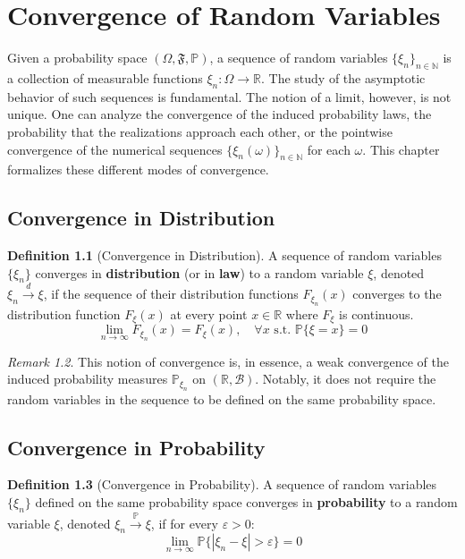 \documentclass[12pt, openany]{book}
\theoremstyle{definition}
\newtheorem{definition}{Definition}[section]
\theoremstyle{plain}
\theoremstyle{remark}
\newtheorem{remark}[definition]{Remark}
\newcommand{\R}{\mathbb{R}}
\newcommand{\N}{\mathbb{N}}
\newcommand{\B}{\mathcal{B}}
\newcommand{\probP}{\mathbb{P}}
\newcommand{\germF}{\mathfrak{F}} %
\begin{document}
\chapter{Convergence of Random Variables}

Given a probability space $(\Omega, \germF, \probP)$, a sequence of random variables $\{\xi_n\}_{n \in \N}$ is a collection of measurable functions $\xi_n: \Omega \to \R$. The study of the asymptotic behavior of such sequences is fundamental. The notion of a limit, however, is not unique. One can analyze the convergence of the induced probability laws, the probability that the realizations approach each other, or the pointwise convergence of the numerical sequences $\{\xi_n(\omega)\}_{n \in \N}$ for each $\omega$. This chapter formalizes these different modes of convergence.

\section{Convergence in Distribution}

\begin{definition}[Convergence in Distribution]
A sequence of random variables $\{\xi_n\}$ converges in \textbf{distribution} (or in \textbf{law}) to a random variable $\xi$, denoted $\xi_n \xrightarrow{d} \xi$, if the sequence of their distribution functions $F_{\xi_n}(x)$ converges to the distribution function $F_\xi(x)$ at every point $x \in \R$ where $F_\xi$ is continuous.
$$ \lim_{n \to \infty} F_{\xi_n}(x) = F_\xi(x), \quad \forall x \text{ s.t. } \probP\{\xi = x\} = 0 $$
\end{definition}

\begin{remark}
This notion of convergence is, in essence, a weak convergence of the induced probability measures $\probP_{\xi_n}$ on $(\R, \B)$. Notably, it does not require the random variables in the sequence to be defined on the same probability space.
\end{remark}

\section{Convergence in Probability}

\begin{definition}[Convergence in Probability]
A sequence of random variables $\{\xi_n\}$ defined on the same probability space converges in \textbf{probability} to a random variable $\xi$, denoted $\xi_n \xrightarrow{\probP} \xi$, if for every $\varepsilon > 0$:
$$ \lim_{n \to \infty} \probP\{|\xi_n - \xi| > \varepsilon\} = 0 $$
\end{definition}
\end{document}
